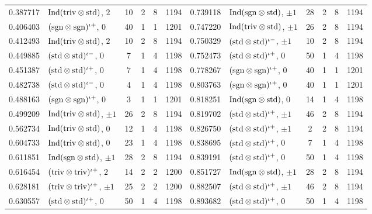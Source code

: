 \documentclass[aps,prx,reprint,superscriptaddress,nobibnotes,longbibliography]{revtex4-2}
\begin{document}
\begin{table}[t]
\begin{ruledtabular}
\begin{tabular}{llcccc|llcccc}
0.387717 & ${\rm Ind}({\rm triv}\otimes{\rm std})$, $2$ & 10 & 2 & 8 & 1194 & 0.739118 & ${\rm Ind}({\rm sgn}\otimes{\rm std})$, $\pm1$ & 28 & 2 & 8 & 1194\\
0.406403 & $({\rm sgn}\otimes{\rm sgn})^{\iota+}$, $0$ & 40 & 1 & 1 & 1201 & 0.747220 & ${\rm Ind}({\rm triv}\otimes{\rm std})$, $\pm1$ & 26 & 2 & 8 & 1194\\
0.412493 & ${\rm Ind}({\rm triv}\otimes{\rm std})$, $2$ & 10 & 2 & 8 & 1194 & 0.750329 & $({\rm std}\otimes{\rm std})^{\iota-}$, $\pm1$ & 10 & 2 & 8 & 1194\\
0.449885 & $({\rm std}\otimes{\rm std})^{\iota-}$, $0$ & 7 & 1 & 4 & 1198 & 0.752473 & $({\rm std}\otimes{\rm std})^{\iota+}$, $0$ & 50 & 1 & 4 & 1198\\
0.451387 & $({\rm std}\otimes{\rm std})^{\iota+}$, $0$ & 7 & 1 & 4 & 1198 & 0.778267 & $({\rm sgn}\otimes{\rm sgn})^{\iota+}$, $0$ & 40 & 1 & 1 & 1201\\
0.482738 & $({\rm std}\otimes{\rm std})^{\iota-}$, $0$ & 4 & 1 & 4 & 1198 & 0.803763 & $({\rm sgn}\otimes{\rm sgn})^{\iota+}$, $0$ & 40 & 1 & 1 & 1201\\
0.488163 & $({\rm sgn}\otimes{\rm sgn})^{\iota+}$, $0$ & 3 & 1 & 1 & 1201 & 0.818251 & ${\rm Ind}({\rm sgn}\otimes{\rm std})$, $0$ & 14 & 1 & 4 & 1198\\
0.499209 & ${\rm Ind}({\rm triv}\otimes{\rm std})$, $\pm1$ & 26 & 2 & 8 & 1194 & 0.819702 & $({\rm std}\otimes{\rm std})^{\iota+}$, $\pm1$ & 46 & 2 & 8 & 1194\\
0.562734 & ${\rm Ind}({\rm triv}\otimes{\rm std})$, $0$ & 12 & 1 & 4 & 1198 & 0.826750 & $({\rm std}\otimes{\rm std})^{\iota+}$, $\pm1$ & 2 & 2 & 8 & 1194\\
0.604733 & ${\rm Ind}({\rm triv}\otimes{\rm std})$, $0$ & 23 & 1 & 4 & 1198 & 0.838695 & $({\rm std}\otimes{\rm std})^{\iota+}$, $0$ & 7 & 1 & 4 & 1198\\
0.611851 & ${\rm Ind}({\rm sgn}\otimes{\rm std})$, $\pm1$ & 28 & 2 & 8 & 1194 & 0.839191 & $({\rm std}\otimes{\rm std})^{\iota+}$, $0$ & 50 & 1 & 4 & 1198\\
0.616454 & $({\rm triv}\otimes{\rm triv})^{\iota+}$, $2$ & 14 & 2 & 2 & 1200 & 0.851727 & ${\rm Ind}({\rm sgn}\otimes{\rm std})$, $\pm1$ & 28 & 2 & 8 & 1194\\
0.628181 & $({\rm triv}\otimes{\rm triv})^{\iota+}$, $\pm1$ & 25 & 2 & 2 & 1200 & 0.882507 & $({\rm std}\otimes{\rm std})^{\iota+}$, $\pm1$ & 46 & 2 & 8 & 1194\\
0.630557 & $({\rm std}\otimes{\rm std})^{\iota+}$, $0$ & 50 & 1 & 4 & 1198 & 0.893682 & $({\rm std}\otimes{\rm std})^{\iota+}$, $0$ & 50 & 1 & 4 & 1198\\

\end{tabular}
\end{ruledtabular}
\end{table}
\end{document}
